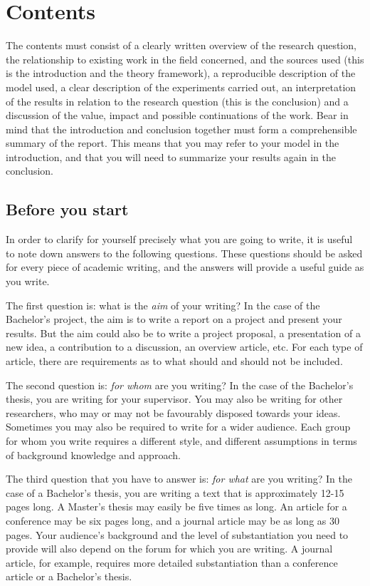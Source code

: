 
\section{Contents}\label{sec:contents}
The contents must consist of a clearly written overview of the research question, the relationship to existing work in the field concerned, and the sources used (this is the introduction and the theory framework), a reproducible description of the model used, a clear description of the experiments carried out, an interpretation of the results in relation to the research question (this is the conclusion) and a discussion of the value, impact and possible continuations of the work.
Bear in mind that the introduction and conclusion together must form a comprehensible summary of the report.
This means that you may refer to your model in the introduction, and that you will need to summarize your results again in the conclusion.

\subsection{Before you start}\label{sec:_before_you_start}
In order to clarify for yourself precisely what you are going to write, it is useful to note down answers to the following questions.
These questions should be asked for every piece of academic writing, and the answers will provide a useful guide as you write.

The first question is: what is the \textit{aim} of your writing?
In the case of the Bachelor's project, the aim is to write a report on a project and present your results.
But the aim could also be to write a project proposal, a presentation of a new idea, a contribution to a discussion, an overview article, etc.
For each type of article, there are requirements as to what should and should not be included.

The second question is: \textit{for whom} are you writing? In the case of the Bachelor's thesis, you are writing for your supervisor.
You may also be writing for other researchers, who may or may not be favourably disposed towards your ideas.
Sometimes you may also be required to write for a wider audience.
Each group for whom you write requires a different style, and different assumptions in terms of background knowledge and approach.

The third question that you have to answer is: \textit{for what} are you writing?
In the case of a Bachelor's thesis, you are writing a text that is approximately 12-15 pages long.
A Master's thesis may easily be five times as long.
An article for a conference may be six pages long, and a journal article may be as long as 30 pages.
Your audience's background and the level of substantiation you need to provide will also depend on the forum for which you are writing.
A journal article, for example, requires more detailed substantiation than a conference article or a Bachelor's thesis.

